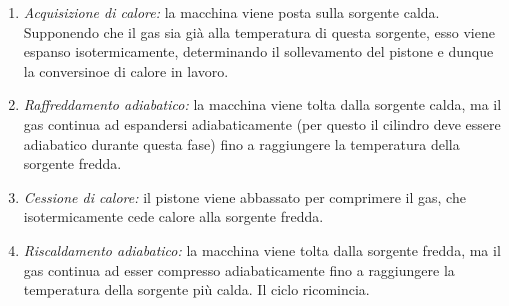 \begin{enumerate}
    \item \textit{Acquisizione di calore:} la macchina viene posta sulla
    sorgente calda. Supponendo che il gas sia già alla temperatura di
    questa sorgente, esso viene espanso isotermicamente, determinando
    il sollevamento del pistone e dunque la conversinoe di calore in
    lavoro.

    \item \textit{Raffreddamento adiabatico:} la macchina viene tolta dalla
    sorgente calda, ma il gas continua ad espandersi adiabaticamente
    (per questo il cilindro deve essere adiabatico durante questa
    fase) fino a raggiungere la temperatura della sorgente fredda.

    \item \textit{Cessione di calore:} il pistone viene abbassato per
    comprimere il gas, che isotermicamente cede calore alla sorgente
    fredda.

    \item \textit{Riscaldamento adiabatico:} la macchina viene tolta dalla sorgente
    fredda, ma il gas continua ad esser compresso adiabaticamente fino
    a raggiungere la temperatura della sorgente più calda. Il ciclo
    ricomincia.
\end{enumerate}

